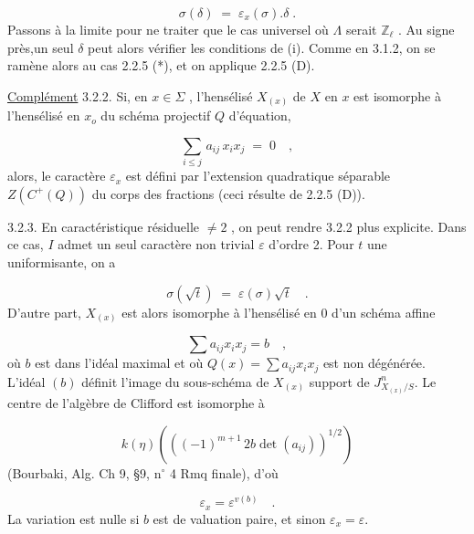 \begin{equation*}
\sigma(\delta) \;=\; \varepsilon_{x}(\sigma).\delta \;.
\end{equation*}
Passons à la limite pour ne traiter que le cas universel où $\Lambda$ serait $\mathbb{Z}_{\ell}$ . Au signe près,un seul $\delta$ peut alors vérifier les conditions de (i). Comme en 3.1.2, on se ramène alors au cas 2.2.5 (*), et on applique 2.2.5 (D).

\underline{Complément} 3.2.2.  Si, en $x \in \Sigma$ , l'hensélisé $X_{(x)}$ de $X$ en $x$ est isomorphe à l'hensélisé en $x_{o}$ du schéma projectif $Q$ d'équation,

\begin{equation*}
\sum_{i \leq j}\, a_{ij}\, x_{i}x_{j} \;=\; 0 \quad ,
\end{equation*}
alors, le caractère $\varepsilon_{x}$ est défini par l'extension quadratique séparable $Z(C^{+}(Q))$ du corps des fractions (ceci résulte de 2.2.5 (D)).

3.2.3.  En caractéristique résiduelle $\neq 2$ , on peut rendre 3.2.2 plus explicite. Dans ce cas, $I$ admet un seul caractère non trivial $\varepsilon$ d'ordre 2. Pour $t$ une uniformisante, on a

\begin{equation*}
\sigma(\sqrt{t}) \;=\; \varepsilon(\sigma)\sqrt{t} \quad .
\end{equation*}
D'autre part, $X_{(x)}$ est alors isomorphe à l'hensélisé en $0$ d'un schéma affine 



\begin{equation*}
\sum a_{ij}x_i x_j = b \quad ,
\end{equation*}
où $b$ est dans l'idéal maximal et où $Q(x)=\sum a_{ij}x_i x_j$ est non dégénérée. L'idéal $(b)$ définit l'image du sous-schéma de $X_{(x)}$ support de $J^n_{X_{(x)}/S}$. Le centre de l'algèbre de Clifford est isomorphe à

\begin{equation*}
k(\eta)\left(\left((-1)^{m+1}\,2b\det(a_{ij})\right)^{1/2}\right)
\end{equation*}
(Bourbaki, Alg. Ch 9, §9, n$^{\circ}$ 4 Rmq finale), d'où

\begin{equation*}
\varepsilon_x = \varepsilon^{v(b)} \quad .
\end{equation*}
La variation est nulle si $b$ est de valuation paire, et sinon $\varepsilon_x=\varepsilon$.

